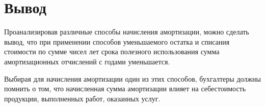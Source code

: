 \section{Вывод}
Проанализировав различные способы начисления амортизации, можно сделать вывод,
что при применении способов уменьшаемого остатка и списания стоимости по сумме
чисел лет срока полезного использования сумма амортизационных отчислений с
годами уменьшается.

Выбирая для начисления амортизации один из этих способов, бухгалтеры должны
помнить о том, что начисленная сумма амортизации влияет на себестоимость
продукции, выполненных работ, оказанных услуг.
